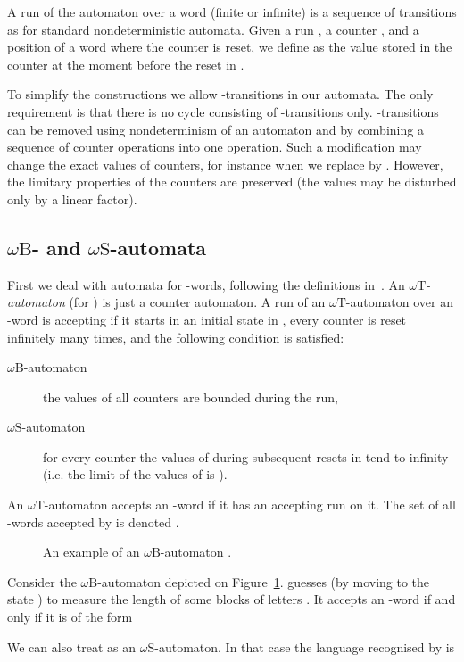 \documentclass{LMCS}
\newcommand{\wB}{\ensuremath{\omega \mathrm{B}}\xspace}
\newcommand{\wS}{\ensuremath{\omega \mathrm{S}}\xspace}
\newcommand{\wT}{\ensuremath{\omega \mathrm{T}}\xspace}
\begin{document}
A run  of the automaton  over a word (finite or infinite) is a sequence of transitions as for standard nondeterministic automata. Given a run , a counter , and a position  of a word where the counter  is reset, we define  as the value stored in the counter  at the moment before the reset  in .

To simplify the constructions we allow -transitions in our automata. The only requirement is that there is no cycle consisting of -transitions only. -transitions can be removed using nondeterminism of an automaton and by combining a sequence of counter operations into one operation. Such a modification may change the exact values of counters, for instance when we replace  by . However, the limitary properties of the counters are preserved (the values may be disturbed only by a linear factor).

\subsection{\wB- and \wS-automata}

First we deal with automata for -words, following the definitions in~\cite{bojanczyk_bounds}. An \emph{\wT-automaton} (for ) is just a counter automaton. A run  of an \wT-automaton over an -word  is accepting if it starts in an initial state in , every counter is reset infinitely many times, and the following condition is satisfied:
\begin{description}
\item[\wB-automaton] the values of all counters are bounded during the run,
\item[\wS-automaton] for every counter  the values of  during subsequent resets in  tend to infinity (i.e. the limit of the values of  is ).
\end{description}

\noindent An \wT-automaton  accepts an -word if it has an accepting run on it. The set of all -words accepted by  is denoted .

\begin{example}
\begin{figure}
\caption{An example of an \wB-automaton .}
\label{fig:wB}
\end{figure}


Consider the \wB-automaton  depicted on Figure~\ref{fig:wB}.  guesses (by moving to the state ) to measure the length of some blocks of letters . It accepts an -word  if and only if it is of the form


We can also treat  as an \wS-automaton. In that case the language recognised by  is

\end{example}
\end{document}
